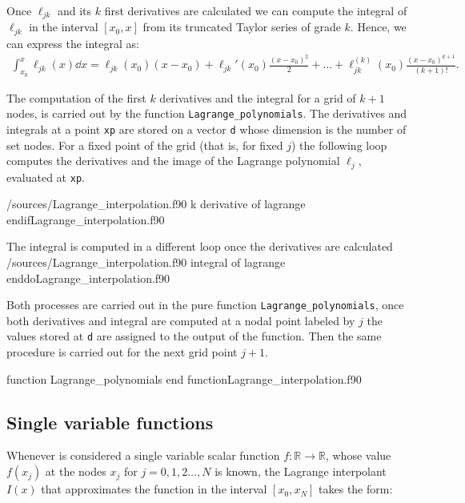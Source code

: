     Once $\ell_{jk}$ and its $k$ first derivatives are calculated we can compute the integral of $\ell_{jk}$ in the interval $[x_0,x]$ from its truncated Taylor series of grade $k$. Hence, we can express the integral as:
    \begin{align}
    	\int_{x_0}^{x}
    	\ell_{jk}(x)
    	\dd x
    	=
    	\ell_{jk}(x_0)(x-x_0)
    	+
    	\ell_{jk}'(x_0)\frac{(x-x_0)^2}{2}
    	+\dots
    	+
    	\ell_{jk}^{(k)}(x_0)\frac{(x-x_0)^{k+1}}{(k+1)!}.
    \end{align}
    
    
    The computation of the first $k$ derivatives and the integral  for a grid of $k+1$ nodes, is carried out by the function \verb|Lagrange_polynomials|. The derivatives and integrals at a point \verb|xp| are stored on a vector \verb|d| whose dimension is the number of set nodes. For a fixed point of the grid (that is, for fixed $j$) the following loop computes the derivatives and the image of the Lagrange polynomial $\ell_j$, evaluated at \verb|xp|. 
    
    \listings
    {\home/sources/Lagrange_interpolation.f90}
    {k derivative of lagrange}
    {endif}{Lagrange_interpolation.f90}
    
    The integral is computed in a different loop once the derivatives are calculated
    \listings
    {\home/sources/Lagrange_interpolation.f90}
    {integral of lagrange}
    {enddo}{Lagrange_interpolation.f90}
    
    Both processes are carried out in the pure function \verb|Lagrange_polynomials|, once both derivatives and integral are computed at a nodal point labeled by $j$ the values stored at \verb|d| are assigned to the output of the function. Then the same procedure is carried out for the next grid point $j+1$.
    
    \newpage
    {function Lagrange_polynomials}
    {end function}{Lagrange_interpolation.f90}
    
    
    \subsection{Single variable functions}
    
    Whenever is considered a single variable scalar function $f:\mathbb{R}\rightarrow\mathbb{R}$, whose value $f(x_j)$ at the nodes $x_j$ for $j=0,1,2\ldots,N$ is known,
     the Lagrange interpolant $I(x)$ that approximates the function in the interval $[x_0,x_N]$ takes the form:
     
